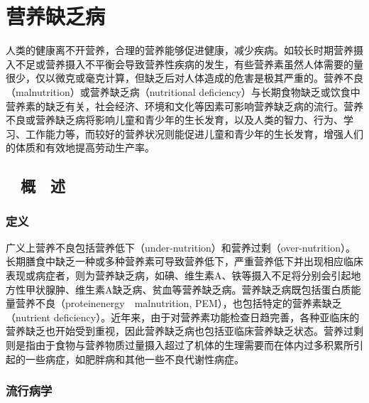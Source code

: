 \chapter{营养缺乏病}

人类的健康离不开营养，合理的营养能够促进健康，减少疾病。如较长时期营养摄入不足或营养摄入不平衡会导致营养性疾病的发生，有些营养素虽然人体需要的量很少，仅以微克或毫克计算，但缺乏后对人体造成的危害是极其严重的。营养不良（malnutrition）或营养缺乏病（nutritional
deficiency）与长期食物缺乏或饮食中营养素的缺乏有关，社会经济、环境和文化等因素可影响营养缺乏病的流行。营养不良或营养缺乏病将影响儿童和青少年的生长发育，以及人类的智力、行为、学习、工作能力等，而较好的营养状况则能促进儿童和青少年的生长发育，增强人们的体质和有效地提高劳动生产率。

\hypertarget{text00003.htmlux5cux23mllj1}{%
\section{　概　述}\label{text00003.htmlux5cux23mllj1}}

\hypertarget{text00003.htmlux5cux23mllj2}{%
\subsection{定义}\label{text00003.htmlux5cux23mllj2}}

广义上营养不良包括营养低下（under-nutrition）和营养过剩（over-nutrition）。长期膳食中缺乏一种或多种营养素可导致营养低下，严重营养低下并出现相应临床表现或病症者，则为营养缺乏病，如碘、维生素A、铁等摄入不足将分别会引起地方性甲状腺肿、维生素A缺乏病、贫血等营养缺乏病。营养缺乏病既包括蛋白质能量营养不良（proteinenergy　malnutrition,
PEM），也包括特定的营养素缺乏（nutrient
deficiency）。近年来，由于对营养素功能检查日趋完善，各种亚临床的营养缺乏也开始受到重视，因此营养缺乏病也包括亚临床营养缺乏状态。营养过剩则是指由于食物与营养物质过量摄入超过了机体的生理需要而在体内过多积累所引起的一些病症，如肥胖病和其他一些不良代谢性病症。

\hypertarget{text00003.htmlux5cux23mllj3}{%
\subsection{流行病学}\label{text00003.htmlux5cux23mllj3}}


